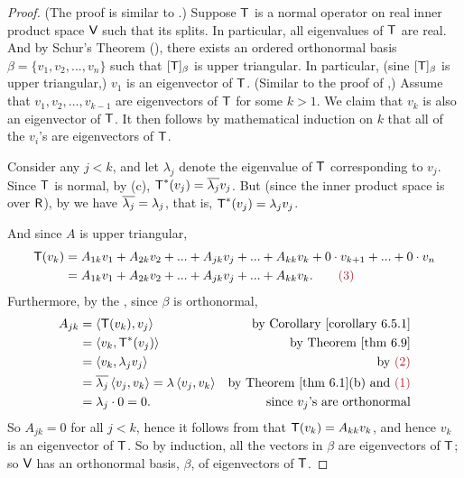 \begin{proof}
(The proof is similar to .)
Suppose \(\textsf{T}\) is a normal operator on real inner product space \(\textsf{V}\) such that its \CPOLY{} splits.
In particular, all eigenvalues of \(\textsf{T}\) are real. 
And by Schur's Theorem (), there exists an ordered orthonormal basis \(\beta = \{ v_1, v_2, ..., v_n \}\) such that \([\textsf{T}]_{\beta}\) is upper triangular.
In particular, (sine \([\textsf{T}]_{\beta}\) is upper triangular,) \(v_1\) is an eigenvector of \(\textsf{T}\).
(Similar to the proof of ,) Assume that \(v_1, v_2, ..., v_{k - 1}\) are eigenvectors of \(\textsf{T}\) for some \(k > 1\).
We claim that \(v_k\) is also an eigenvector of \(\textsf{T}\).
It then follows by mathematical induction on \(k\) that all of the \(v_i\)'s are eigenvectors of \(\textsf{T}\).

Consider any \(j < k\), and let \(\lambda_j\) denote the eigenvalue of \(\textsf{T}\) corresponding to \(v_j\).
Since \(\textsf{T}\) is normal, by (c), \(\textsf{T}^*(v_j) = \overline{\lambda_j} v_j\).
But (since the inner product space is over \(\textsf{R}\)), by  we have \(\overline{\lambda_j} = \lambda_j\), that is, \(\textsf{T}^*(v_j) = \lambda_j v_j\). 

And since \(A\) is upper triangular,
\begin{align*}
    \T(v_k) & = A_{1k} v_1 + A_{2k} v_2 + ... + A_{jk} v_j + ... + A_{kk}v_k + 0 \cdot v_{k + 1} + ... + 0 \cdot v_{n} \\
    & = A_{1k} v_1 + A_{2k} v_2 + ... + A_{jk} v_j + ... + A_{kk}v_k. \quad \quad \MAROON{(3)}
\end{align*}
Furthermore, by the , since \(\beta\) is orthonormal,
\begin{align*}
    A_{jk} & = \LG \T(v_k), v_j \RG & \text{by \CORO{6.5.1}} \\
        & = \LG v_k, \T^*(v_j) \RG & \text{by \THM{6.9}} \\
        & = \LG v_k, \lambda_j v_j \RG & \text{by \MAROON{(2)}} \\
        & = \conjugatet{\lambda_j} \LG v_j, v_k \RG = \lambda \LG v_j, v_k \RG & \text{by \THM{6.1}(b) and \MAROON{(1)}} \\
        & = \lambda_j \cdot 0 = 0. & \text{since \(v_j\)'s are orthonormal}
\end{align*}
So \(A_{jk} = 0\) for all \(j < k\), hence it follows from  that \(\textsf{T}(v_k) = A_{kk} v_k\), and hence \(v_k\) is an eigenvector of \(\textsf{T}\).
So by induction, all the vectors in \(\beta\) are eigenvectors of \(\textsf{T}\);
so \(\textsf{V}\) has an orthonormal basis, \(\beta\), of eigenvectors of \(\textsf{T}\).
\end{proof}

